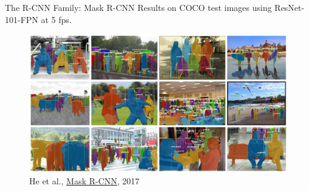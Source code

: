 \documentclass[handout]{beamer}
\begin{document}
\begin{frame}{The R-CNN Family: Mask R-CNN}
Results on COCO test images using ResNet-101-FPN at 5 fps. 
\begin{figure}
\centering
	\includegraphics[width=\textwidth,keepaspectratio]{../media/mask-rcnn-examples.png}
	\caption{He et al., \href{https://arxiv.org/abs/1703.06870}{\color{blue}Mask R-CNN}, 2017}
\end{figure}
\end{frame}
\end{document}
